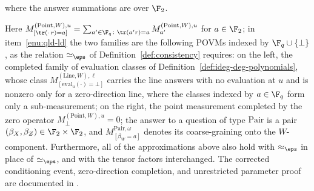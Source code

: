 \begin{lemma}
\begin{enumerate}
		where the answer summations are over $\F_2$.
	\end{enumerate}
	Here
	$M^{(\mathrm{Point},W),u}_{[\tr(\cdot\,r)=a]} = \sum_{a' \in \F_q \colon \tr(a'r)=a} M^{(\mathrm{Point},W),u}_{a'}$
	for $a \in \F_2$; in item~\ref{enu:qld-ld} the two families are the
	following POVMs indexed by $\F_q \cup \{\bot\}$, as the relation
	$\simeq_\eps$ of Definition~\ref{def:consistency} requires: on the left,
	the completed family of evaluation classes of
	Definition~\ref{def:ideg-deg-polynomials}, whose class
	$M^{(\mathrm{Line},W),\ell}_{[\mathrm{eval}_u(\cdot)=\bot]}$ carries the
	line answers with no evaluation at $u$ and is nonzero only for a
	zero-direction line, where the classes indexed by $a \in \F_q$ form
	only a sub-measurement; on the right, the point measurement completed
	by the zero operator $M^{(\mathrm{Point},W),u}_{\bot} = 0$; the answer
	to a question of type $\mathrm{Pair}$ is a
	pair $(\beta_X,\beta_Z) \in \F_2 \times \F_2$, and
	$M^{\mathrm{Pair},\omega}_{[\beta_W=a]}$ denotes its coarse-graining
	onto the $W$-component. Furthermore, all of the approximations above
	also hold with $\approx_\eps$ in place of $\simeq_\eps$, and with the
	tensor factors interchanged.  The corrected conditioning event,
	zero-direction completion, and unrestricted parameter proof are documented
	in \cite{gap:qpbt_win-implications-corrections}.
\end{lemma}
